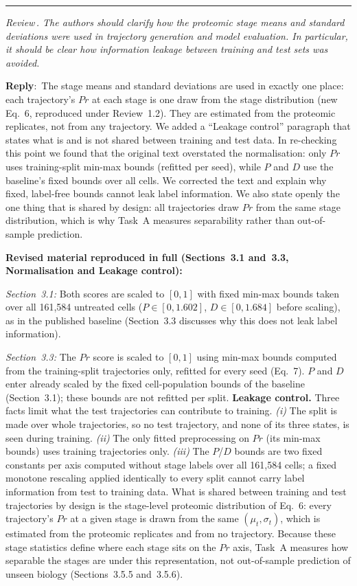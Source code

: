 \documentclass[11pt]{article}
\newcounter{reviewer}
\newcounter{point}[reviewer]
\renewcommand{\thepoint}{Review\,\thereviewer.\arabic{point}}
\newcommand{\point}[1]{\refstepcounter{point}  \bigskip \hrule \medskip \noindent \textit{{\fontseries{b}\selectfont \thepoint } #1}\par}
\newcommand{\reply}{\medskip \noindent \textbf{Reply}:\ }
\newcommand{\revisedheading}[1]{\medskip\noindent\textbf{Revised material
  reproduced in full (#1):}\par}
\newenvironment{revised}{\par\color{red}}{\par}
\begin{document}
\point{The authors should clarify how the proteomic stage means and standard deviations were used in trajectory generation and model evaluation. In particular, it should be clear how information leakage between training and test sets was avoided.}

\reply{The stage means and standard deviations are used in exactly one place: each trajectory's $Pr$ at each stage is one draw from the stage distribution (new Eq.~6, reproduced under Review~1.2). They are estimated from the proteomic replicates, not from any trajectory. We added a ``Leakage control'' paragraph that states what is and is not shared between training and test data. In re-checking this point we found that the original text overstated the normalisation: only $Pr$ uses training-split min-max bounds (refitted per seed), while $P$ and $D$ use the baseline's fixed bounds over all cells. We corrected the text and explain why fixed, label-free bounds cannot leak label information. We also state openly the one thing that is shared by design: all trajectories draw $Pr$ from the same stage distribution, which is why Task~A measures separability rather than out-of-sample prediction.}

\revisedheading{Sections~3.1 and~3.3, Normalisation and Leakage control}
\begin{revised}
\textit{Section~3.1:} Both scores are scaled to $[0,1]$ with fixed min-max bounds taken over all 161,584 untreated cells ($P \in [0, 1.602]$, $D \in [0, 1.684]$ before scaling), as in the published baseline (Section~3.3 discusses why this does not leak label information).

\textit{Section~3.3:} The $Pr$ score is scaled to $[0,1]$ using min-max bounds computed from the training-split trajectories only, refitted for every seed (Eq.~7). $P$ and $D$ enter already scaled by the fixed cell-population bounds of the baseline (Section~3.1); these bounds are not refitted per split. \textbf{Leakage control.} Three facts limit what the test trajectories can contribute to training. \textit{(i)} The split is made over whole trajectories, so no test trajectory, and none of its three states, is seen during training. \textit{(ii)} The only fitted preprocessing on $Pr$ (its min-max bounds) uses training trajectories only. \textit{(iii)} The $P$/$D$ bounds are two fixed constants per axis computed without stage labels over all 161,584 cells; a fixed monotone rescaling applied identically to every split cannot carry label information from test to training data. What is shared between training and test trajectories by design is the stage-level proteomic distribution of Eq.~6: every trajectory's $Pr$ at a given stage is drawn from the same $(\mu_{t}, \sigma_{t})$, which is estimated from the proteomic replicates and from no trajectory. Because these stage statistics define where each stage sits on the $Pr$ axis, Task~A measures how separable the stages are under this representation, not out-of-sample prediction of unseen biology (Sections~3.5.5 and~3.5.6).
\end{revised}
\end{document}
